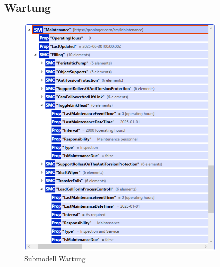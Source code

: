\subsection{Wartung}
\begin{figure}[H]
    \centering
    \includegraphics[width=0.9\textwidth]{Bilder/ErgebnissePackageExplorer/Wartung.PNG}
    \caption{Submodell Wartung}
\end{figure}

